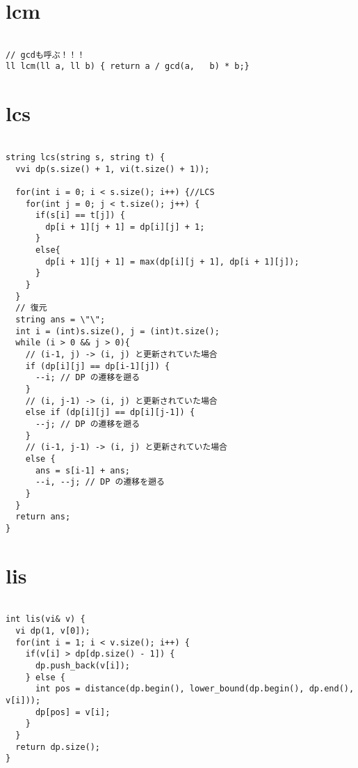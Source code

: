 \documentclass{jsarticle}
\begin{document}
\color{white}
\section{lcm}
\color{black}
\begin{lstlisting}[caption=lcm]

// gcdも呼ぶ！！！
ll lcm(ll a, ll b) { return a / gcd(a,   b) * b;}

\end{lstlisting}

\color{white}
\section{lcs}
\color{black}
\begin{lstlisting}[caption=lcs]

string lcs(string s, string t) {
  vvi dp(s.size() + 1, vi(t.size() + 1));
  
  for(int i = 0; i < s.size(); i++) {//LCS
    for(int j = 0; j < t.size(); j++) {
      if(s[i] == t[j]) {
        dp[i + 1][j + 1] = dp[i][j] + 1;
      }
      else{
        dp[i + 1][j + 1] = max(dp[i][j + 1], dp[i + 1][j]);
      }
    }
  }
  // 復元
  string ans = \"\";
  int i = (int)s.size(), j = (int)t.size();
  while (i > 0 && j > 0){
    // (i-1, j) -> (i, j) と更新されていた場合
    if (dp[i][j] == dp[i-1][j]) {
      --i; // DP の遷移を遡る
    }
    // (i, j-1) -> (i, j) と更新されていた場合
    else if (dp[i][j] == dp[i][j-1]) {
      --j; // DP の遷移を遡る
    }
    // (i-1, j-1) -> (i, j) と更新されていた場合
    else {
      ans = s[i-1] + ans;
      --i, --j; // DP の遷移を遡る
    }
  }
  return ans;
}

\end{lstlisting}

\color{white}
\section{lis}
\color{black}
\begin{lstlisting}[caption=lis]

int lis(vi& v) {
  vi dp(1, v[0]);
  for(int i = 1; i < v.size(); i++) {
    if(v[i] > dp[dp.size() - 1]) {
      dp.push_back(v[i]);
    } else {
      int pos = distance(dp.begin(), lower_bound(dp.begin(), dp.end(), v[i]));
      dp[pos] = v[i];
    }
  }
  return dp.size();
}

\end{lstlisting}

\color{white}
\end{document}
